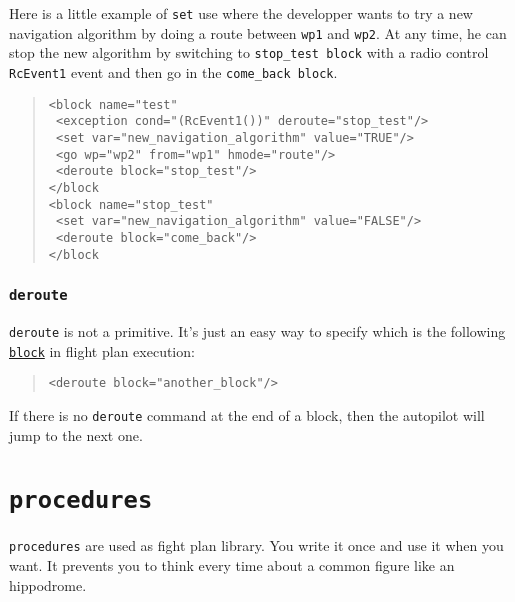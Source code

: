 \documentclass{article}
\renewcommand{\tt}[1]{\texttt{#1}}
\newcommand{\ex}[1]{\colorbox[gray]{0.92}{\tt{#1}}}
\newcommand{\hs}[1]{\hspace*{#1cm}}
\newcommand{\qt}[1]{\textcolor{gris75}{#1}}
\begin{document}
\begin{minipage}[ctb]{\textwidth}
Here is a little example of \tt{set} use where the developper wants to try a
new navigation algorithm by doing a route between \tt{wp1} and \tt{wp2}.
At any time, he can stop the new algorithm by switching to
\tt{stop\_test block} with a radio control \tt{RcEvent1} event and then go
in the \tt{come\_back block}.
\begin{quote}
	\ex{<block name="\qt{test}"} \\ 
	\ex{\hs{0.5} <exception cond="\qt{(RcEvent1())}" deroute="\qt{stop\_test}"/>} \\
	\ex{\hs{0.5} <set var="\qt{new\_navigation\_algorithm}" value="\qt{TRUE}"/>} \\
	\ex{\hs{0.5} <go wp="\qt{wp2}" from="\qt{wp1}" hmode="\qt{route}"/>} \\
	\ex{\hs{0.5} <deroute block="\qt{stop\_test}"/>} \\
	\ex{</block}\\
	\ex{<block name="\qt{stop\_test}"} \\ 
	\ex{\hs{0.5} <set var="\qt{new\_navigation\_algorithm}" value="\qt{FALSE}"/>} \\
	\ex{\hs{0.5} <deroute block="\qt{come\_back}"/>} \\
	\ex{</block}\\
\end{quote}
\end{minipage}


\hypertarget{deroute}{\subsubsection{\tt{deroute}}}
\tt{deroute} is not a primitive. It's just an easy way to specify which is the
following \hyperlink{blocks}{\tt{block}} in flight plan execution:
\begin{quote}
	\ex{<deroute block="\qt{another\_block}"/>}
\end{quote}


If there is no \tt{deroute} command at the end of a block, then the autopilot
will jump to the next one.


\hypertarget{procedures}{\section{\tt{procedures}}}
\tt{procedures} are used as fight plan library. You write it once and use it
when you want. It prevents you to think every time about a common figure like
an hippodrome.
\end{document}

